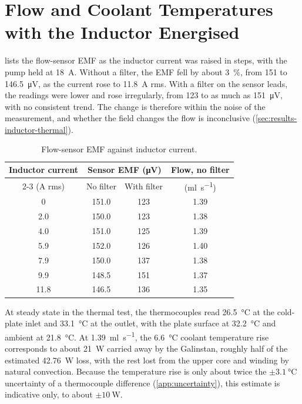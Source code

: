 \section{Flow and Coolant Temperatures with the Inductor Energised}

 lists the flow-sensor EMF as the inductor current was
raised in steps, with the pump held at \SI{18}{\ampere}. Without a filter, the
EMF fell by about \SI{3}{\percent}, from 151 to \SI{146.5}{\micro\volt}, as the
current rose to \SI{11.8}{\ampere} rms. With a filter on the sensor leads, the
readings were lower and rose irregularly, from 123 to as much as
\SI{151}{\micro\volt}, with no consistent trend. The change is therefore within the noise of the measurement, and whether
the field changes the flow is inconclusive (\cref{sec:results-inductor-thermal}).

\begin{table}[htbp]
  \centering
  \caption{Flow-sensor EMF against inductor current.}
  \label{tab:app-inductor-emf}
  \small
  \begin{tabular}{@{}cccc@{}}
    \toprule
    Inductor current & \multicolumn{2}{c}{Sensor EMF (\si{\micro\volt})}
      & Flow, no filter \\
    \cmidrule(lr){2-3}
    (\si{\ampere} rms) & No filter & With filter & (\si{\milli\litre\per\second}) \\
    \midrule
    0    & 151.0 & 123 & 1.39 \\
    2.0  & 150.0 & 123 & 1.38 \\
    4.0  & 151.0 & 125 & 1.39 \\
    5.9  & 152.0 & 126 & 1.40 \\
    7.9  & 150.0 & 137 & 1.38 \\
    9.9  & 148.5 & 151 & 1.37 \\
    11.8 & 146.5 & 136 & 1.35 \\
    \bottomrule
  \end{tabular}
\end{table}

At steady state in the thermal test, the thermocouples read \SI{26.5}{\celsius}
at the cold-plate inlet and \SI{33.1}{\celsius} at the outlet, with the plate
surface at \SI{32.2}{\celsius} and ambient at \SI{21.8}{\celsius}. At
\SI{1.39}{\milli\litre\per\second}, the \SI{6.6}{\celsius} coolant temperature
rise corresponds to about \SI{21}{\watt} carried away by the Galinstan, roughly
half of the estimated \SI{42.76}{\watt} loss, with the rest lost from the upper
core and winding by natural convection. Because the temperature rise is only
about twice the $\pm\SI{3.1}{\celsius}$ uncertainty of a thermocouple difference
(\cref{app:uncertainty}), this estimate is indicative only, to about
$\pm\SI{10}{\watt}$.
